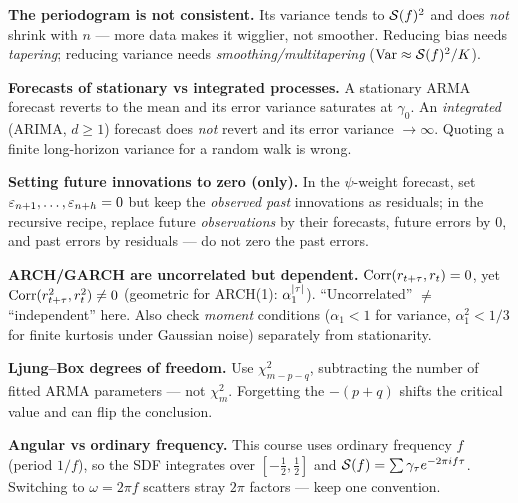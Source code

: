 \begin{pitfall}
\textbf{The periodogram is not consistent.} Its variance tends to $\mathcal{S}(f)^2$
and does \emph{not} shrink with $n$ --- more data makes it wigglier, not
smoother. Reducing bias needs \emph{tapering}; reducing variance needs
\emph{smoothing/multitapering} ($\operatorname{Var}\approx\mathcal{S}(f)^2/K$).
\end{pitfall}

\begin{pitfall}
\textbf{Forecasts of stationary vs integrated processes.} A stationary ARMA
forecast reverts to the mean and its error variance saturates at $\gamma_0$. An
\emph{integrated} (ARIMA, $d\ge1$) forecast does \emph{not} revert and its error
variance $\to\infty$. Quoting a finite long-horizon variance for a random walk
is wrong.
\end{pitfall}

\begin{pitfall}
\textbf{Setting future innovations to zero (only).} In the $\psi$-weight
forecast, set $\varepsilon_{n+1},\dots,\varepsilon_{n+h}=0$ but keep the \emph{observed past}
innovations as residuals; in the recursive recipe, replace future
\emph{observations} by their forecasts, future errors by $0$, and past errors by
residuals --- do not zero the past errors.
\end{pitfall}

\begin{pitfall}
\textbf{ARCH/GARCH are uncorrelated but dependent.} $\operatorname{Corr}(r_{t+\tau},r_t)=0$,
yet $\operatorname{Corr}(r^2_{t+\tau},r^2_t)\ne0$ (geometric for ARCH(1):
$\alpha_1^{\left\lvert \tau \right\rvert}$). ``Uncorrelated'' $\ne$ ``independent'' here. Also check
\emph{moment} conditions ($\alpha_1<1$ for variance, $\alpha_1^2<1/3$ for finite
kurtosis under Gaussian noise) separately from stationarity.
\end{pitfall}

\begin{pitfall}
\textbf{Ljung--Box degrees of freedom.} Use $\chi^2_{m-p-q}$, subtracting the
number of fitted ARMA parameters --- not $\chi^2_m$. Forgetting the $-(p+q)$
shifts the critical value and can flip the conclusion.
\end{pitfall}

\begin{pitfall}
\textbf{Angular vs ordinary frequency.} This course uses ordinary frequency $f$
(period $1/f$), so the SDF integrates over $[-\tfrac12,\tfrac12]$ and
$\mathcal{S}(f)=\sum\gamma_\tau e^{-2\pi i f\tau}$. Switching to $\omega=2\pi f$ scatters
stray $2\pi$ factors --- keep one convention.
\end{pitfall}

